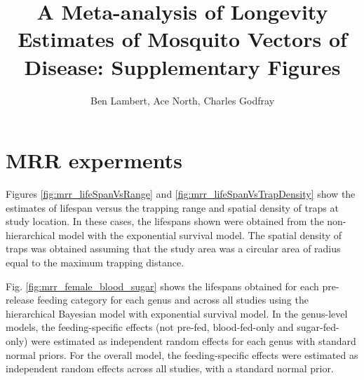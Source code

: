 \documentclass[12pt]{article}
\title{A Meta-analysis of Longevity Estimates of Mosquito Vectors of Disease: Supplementary Figures}
\author{Ben Lambert, Ace North, Charles Godfray}
\begin{document}
\maketitle

\section{MRR experments}
Figures \ref{fig:mrr_lifeSpanVsRange} and \ref{fig:mrr_lifeSpanVsTrapDensity} show the estimates of lifespan versus the trapping range and spatial density of traps at study location. In these cases, the lifespans shown were obtained from the non-hierarchical model with the exponential survival model. The spatial density of traps was obtained assuming that the study area was a circular area of radius equal to the maximum trapping distance.

Fig. \ref{fig:mrr_female_blood_sugar} shows the lifespans obtained for each pre-release feeding category for each genus and across all studies using the hierarchical Bayesian model with exponential survival model. In the genus-level models, the feeding-specific effects (not pre-fed, blood-fed-only and sugar-fed-only) were estimated as independent random effects for each genus with standard normal priors. For the overall model, the feeding-specific effects were estimated as independent random effects across all studies, with a standard normal prior.
\end{document}
